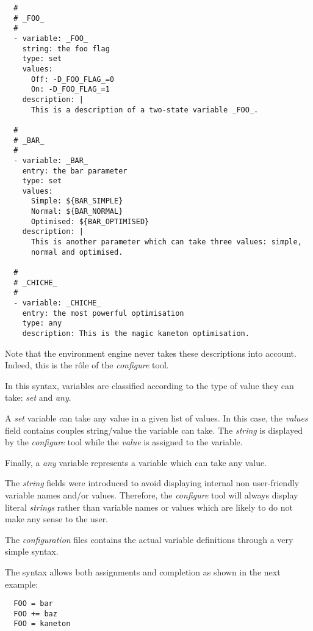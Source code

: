 \begin{verbatim}
  #
  # _FOO_
  #
  - variable: _FOO_
    string: the foo flag
    type: set
    values:
      Off: -D_FOO_FLAG_=0
      On: -D_FOO_FLAG_=1
    description: |
      This is a description of a two-state variable _FOO_.

  #
  # _BAR_
  #
  - variable: _BAR_
    entry: the bar parameter
    type: set
    values:
      Simple: ${BAR_SIMPLE}
      Normal: ${BAR_NORMAL}
      Optimised: ${BAR_OPTIMISED}
    description: |
      This is another parameter which can take three values: simple,
      normal and optimised.

  #
  # _CHICHE_
  #
  - variable: _CHICHE_
    entry: the most powerful optimisation
    type: any
    description: This is the magic kaneton optimisation.
\end{verbatim}

Note that the environment engine never takes these descriptions into account.
Indeed, this is the r\^ole of the \textit{configure} tool.

In this syntax, variables are classified according to the type of value
they can take: \textit{set} and \textit{any}.

A \textit{set} variable can take any value in a given list of values. In
this case, the \textit{values} field contains couples string/value the
variable can take. The \textit{string} is displayed by the \textit{configure}
tool while the \textit{value} is assigned to the variable.

Finally, a \textit{any} variable represents a variable which can take any
value.

The \textit{string} fields were introduced to avoid displaying internal
non user-friendly variable names and/or values. Therefore, the
\textit{configure} tool will always display literal \textit{strings}
rather than variable names or values which are likely to do not make any
sense to the user.



The \textit{configuration} files contains the actual variable definitions
through a very simple syntax.

The syntax allows both assignments and completion as shown in the next example:

\begin{verbatim}
  FOO = bar
  FOO += baz
  FOO = kaneton
\end{verbatim}

